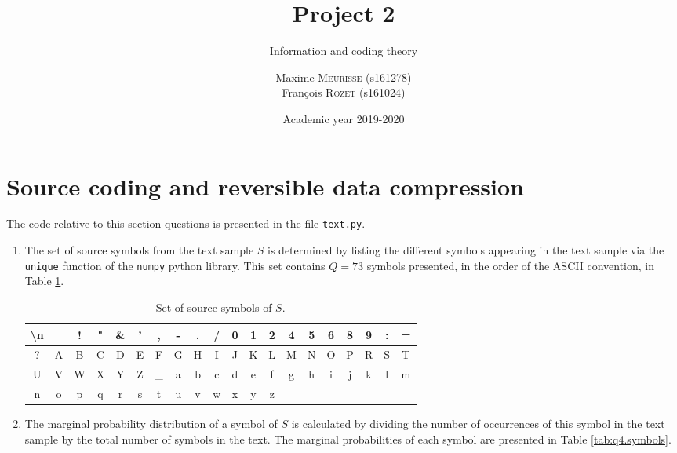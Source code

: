 \documentclass[a4paper, 12pt]{article}
\institute{University of Liège}
\title{Project 2}
\subtitle{Information and coding theory}
\author{
    Maxime \textsc{Meurisse} (s161278)\\
    François \textsc{Rozet} (s161024)\\
}
\date{Academic year 2019-2020}
\begin{document}
    
    \maketitle
    
    
    \section*{Source coding and reversible data compression}
    
    The code relative to this section questions is presented in the file \texttt{text.py}.
    
    \begin{enumerate}[leftmargin=*]
        
        \item The set of source symbols from the text sample $S$ is determined by listing the different symbols appearing in the text sample via the \texttt{unique} function of the \texttt{numpy} python library. This set contains $Q = 73$ symbols presented, in the order of the ASCII convention, in Table \ref{tab:q1.symbols}.
        
        \begin{table}[H]
            \centering
            \begin{tabular}{|c|c|c|c|c|c|c|c|c|c|c|c|c|c|c|c|c|c|c|c|}
                \hline
                \textbackslash n & & ! & " & \& & ' & , & - & . & / & 0 & 1 & 2 & 4 & 5 & 6 & 8 & 9 & : & =\\ \hline
                ? & A & B & C & D & E & F & G & H & I & J & K & L & M & N & O & P & R & S & T\\ \hline
                U & V & W & X & Y & Z & \_ & a & b & c & d & e & f & g & h & i & j & k & l & m\\ \hline
                n & o & p & q & r & s & t & u & v & w & x & y & z\\ \cline{1-13}
            \end{tabular}
            \caption{Set of source symbols of $S$.}
            \label{tab:q1.symbols}
        \end{table}
        
        
        \item The marginal probability distribution of a symbol of $S$ is calculated by dividing the number of occurrences of this symbol in the text sample by the total number of symbols in the text. The marginal probabilities of each symbol are presented in Table \ref{tab:q4.symbols}.
        

\end{enumerate}
\end{document}
